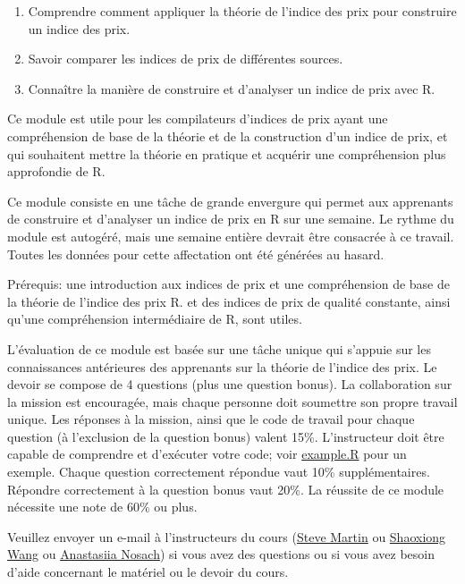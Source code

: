 \documentclass[
]{article}
\providecommand{\tightlist}{%
  \setlength{\itemsep}{0pt}\setlength{\parskip}{0pt}}
\begin{document}
\begin{enumerate}
\def\labelenumi{\arabic{enumi}.}
\tightlist
\item
  Comprendre comment appliquer la théorie de l'indice des prix pour construire un indice des prix.
\item
  Savoir comparer les indices de prix de différentes sources.
\item
  Connaître la manière de construire et d'analyser un indice de prix avec R.
\end{enumerate}

Ce module est utile pour les compilateurs d'indices de prix ayant une compréhension de base de la théorie et de la construction d'un indice de prix, et qui souhaitent mettre la théorie en pratique et acquérir une compréhension plus approfondie de R.

Ce module consiste en une tâche de grande envergure qui permet aux apprenants de construire et d'analyser un indice de prix en R sur une semaine. Le rythme du module est autogéré, mais une semaine entière devrait être consacrée à ce travail. Toutes les données pour cette affectation ont été générées au hasard.

Prérequis: une introduction aux indices de prix et une compréhension de base de la théorie de l'indice des prix R. et des indices de prix de qualité constante, ainsi qu'une compréhension intermédiaire de R, sont utiles.

L'évaluation de ce module est basée sur une tâche unique qui s'appuie sur les connaissances antérieures des apprenants sur la théorie de l'indice des prix. Le devoir se compose de 4 questions (plus une question bonus). La collaboration sur la mission est encouragée, mais chaque personne doit soumettre son propre travail unique. Les réponses à la mission, ainsi que le code de travail pour chaque question (à l'exclusion de la question bonus) valent 15\%. L'instructeur doit être capable de comprendre et d'exécuter votre code; voir \href{scripts/example.R}{example.R} pour un exemple. Chaque question correctement répondue vaut 10\% supplémentaires. Répondre correctement à la question bonus vaut 20\%. La réussite de ce module nécessite une note de 60\% ou plus.

Veuillez envoyer un e-mail à l'instructeurs du cours (\href{mailto:steve.martin5@canada.ca}{Steve Martin} ou \href{mailto:shaoxiong.wang@canada.ca}{Shaoxiong Wang} ou \href{mailto:anastasiia.nosach@canada.ca}{Anastasiia Nosach}) si vous avez des questions ou si vous avez besoin d'aide concernant le matériel ou le devoir du cours.
\end{document}
